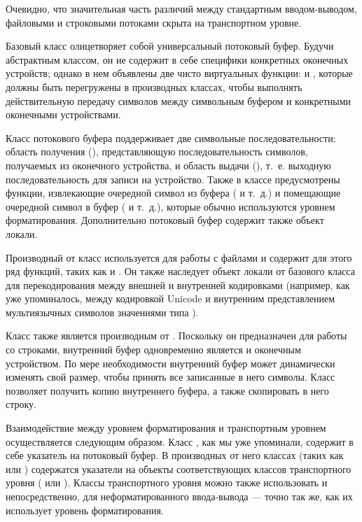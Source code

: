 Очевидно, что значительная часть различий между стандартным вводом-выводом, файловыми и строковыми потоками скрыта на
транспортном уровне.

Базовый класс  олицетворяет собой универсальный потоковый буфер. Будучи абстрактным
классом, он не содержит в себе специфики конкретных оконечных устройств; однако в нем объявлены две чисто виртуальных
функции:  и , которые должны быть перегружены в
производных классах, чтобы выполнять действительную передачу символов между символьным буфером и конкретными оконечными
устройствами.

Класс потокового буфера поддерживает две символьные последовательности: область получения (),
представляющую последовательность символов, получаемых из оконечного устройства, и область выдачи
(), т.~е. выходную последовательность для записи на устройство. Также в классе предусмотрены
функции, извлекающие очередной символ из буфера ( и т.~д.) и помещающие очередной символ в
буфер ( и т.~д.), которые обычно используются уровнем форматирования. Дополнительно
потоковый буфер содержит также объект локали.

Производный от  класс  используется для работы с файлами и
содержит для этого ряд функций, таких как  и . Он также
наследует объект локали от базового класса для перекодирования между внешней и внутренней кодировками (например, как
уже упоминалось, между кодировкой Unicode и внутренним представлением мультиязычных символов значениями типа
).

Класс  также является производным от . Поскольку он
предназначен для работы со строками, внутренний буфер одновременно является и оконечным устройством.  По мере
необходимости внутренний буфер может динамически изменять свой размер, чтобы принять все записанные в него символы.
Класс позволяет получить копию внутреннего буфера, а также скопировать в него строку.

Взаимодействие между уровнем форматирования и транспортным уровнем осуществляется следующим образом. Класс
, как мы уже упоминали, содержит в себе указатель на потоковый буфер. В производных от него
классах (таких как  или ) содержатся указатели на
объекты соответствующих классов транспортного уровня ( или
). Классы транспортного уровня можно также использовать и непосредственно, для
неформатированного ввода-вывода --- точно так же, как их использует уровень форматирования.

